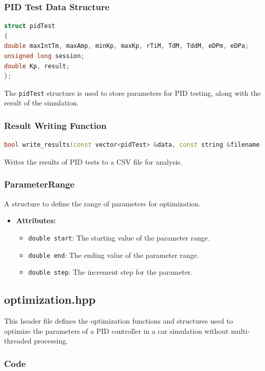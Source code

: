 \documentclass[a4paper,12pt]{./article}
\begin{document}
\subsubsection{PID Test Data Structure}
\begin{lstlisting}[language=C++]
struct pidTest
{
double maxIntTm, maxAmp, minKp, maxKp, rTiM, TdM, TddM, eDPm, eDPa;
unsigned long session;
double Kp, result;
};
\end{lstlisting}
The \texttt{pidTest} structure is used to store parameters for PID testing, along with the result of the simulation.
\subsubsection{Result Writing Function}
\begin{lstlisting}[language=C++]
bool write_results(const vector<pidTest> &data, const string &filename)
\end{lstlisting}
Writes the results of PID tests to a CSV file for analysis.
\subsubsection{ParameterRange}
A structure to define the range of parameters for optimization.
\begin{itemize}
\item \textbf{Attributes:}
\begin{itemize}
\item \texttt{double start}: The starting value of the parameter range.
\item \texttt{double end}: The ending value of the parameter range.
\item \texttt{double step}: The increment step for the parameter.
\end{itemize}
\end{itemize}
\subsection{optimization.hpp}
This header file defines the optimization functions and structures used to optimize the parameters of a PID controller in a car simulation without multi-threaded processing.
\subsubsection{Code}

\end{document}
